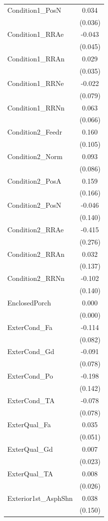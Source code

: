 \begin{table}[!htbp]
\begin{tabular}{@{\extracolsep{5pt}}lc}
 Condition1_PosN & 0.034$^{}$ \\
& (0.036) \\
 Condition1_RRAe & -0.043$^{}$ \\
& (0.045) \\
 Condition1_RRAn & 0.029$^{}$ \\
& (0.035) \\
 Condition1_RRNe & -0.022$^{}$ \\
& (0.079) \\
 Condition1_RRNn & 0.063$^{}$ \\
& (0.066) \\
 Condition2_Feedr & 0.160$^{}$ \\
& (0.105) \\
 Condition2_Norm & 0.093$^{}$ \\
& (0.086) \\
 Condition2_PosA & 0.159$^{}$ \\
& (0.166) \\
 Condition2_PosN & -0.046$^{}$ \\
& (0.140) \\
 Condition2_RRAe & -0.415$^{}$ \\
& (0.276) \\
 Condition2_RRAn & 0.032$^{}$ \\
& (0.137) \\
 Condition2_RRNn & -0.102$^{}$ \\
& (0.140) \\
 EnclosedPorch & 0.000$^{}$ \\
& (0.000) \\
 ExterCond_Fa & -0.114$^{}$ \\
& (0.082) \\
 ExterCond_Gd & -0.091$^{}$ \\
& (0.078) \\
 ExterCond_Po & -0.198$^{}$ \\
& (0.142) \\
 ExterCond_TA & -0.078$^{}$ \\
& (0.078) \\
 ExterQual_Fa & 0.035$^{}$ \\
& (0.051) \\
 ExterQual_Gd & 0.007$^{}$ \\
& (0.023) \\
 ExterQual_TA & 0.008$^{}$ \\
& (0.026) \\
 Exterior1st_AsphShn & 0.038$^{}$ \\
& (0.150) \\

\end{tabular}
\end{table}

